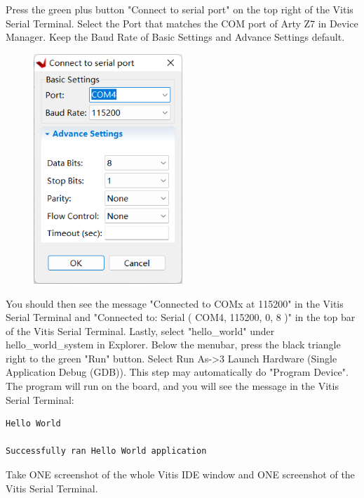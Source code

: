 \documentclass[a4paper,12pt,twoside]{article}
\begin{document}
Press the green plus button "Connect to serial port" on the top right of the Vitis Serial Terminal. Select the Port that matches the COM port of Arty Z7 in Device Manager. Keep the Baud Rate of Basic Settings and Advance Settings default.
\begin{figure}[H]
    \centering
    \includegraphics[width=0.5\textwidth]{images/19.png}
\end{figure}
You should then see the message "Connected to COMx at 115200" in the Vitis Serial Terminal and "Connected to: Serial ( COM4, 115200, 0, 8 )" in the top bar of the Vitis Serial Terminal. Lastly, select "hello\_world" under hello\_world\_system in Explorer. Below the menubar, press the black triangle right to the green "Run" button. Select Run As->3 Launch Hardware (Single Application Debug (GDB)). This step may automatically do "Program Device". The program will run on the board, and you will see the message in the Vitis Serial Terminal:
\begin{verbatim}
Hello World

Successfully ran Hello World application
\end{verbatim}
Take ONE screenshot of the whole Vitis IDE window and ONE screenshot of the Vitis Serial Terminal.

\newpage
\end{document}
